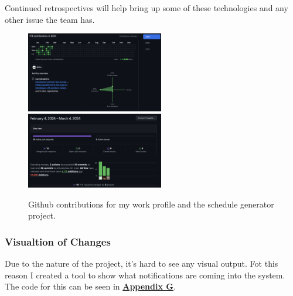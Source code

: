   Continued retrospectives will help bring up some of these technologies and any other issue the team has.

  \begin{figure}[H]
    \centering
    \includegraphics[width=6cm]{assets/outputs/githubContributions.png}
    \includegraphics[width=6cm]{assets/outputs/scheduleGeneratorChanges.png}

    \caption{Github contributions for my work profile and the schedule generator project.}
    \label{fig:githubStats}
  \end{figure}

  \subsubsection{Visualtion of Changes}
  Due to the nature of the project, it's hard to see any visual output. Fot this reason I created a tool to show what notifications are coming 
  into the system. The code for this can be seen in \hyperref[sec:sec:AppendixG]{\textbf{Appendix G}}.

\newpage
